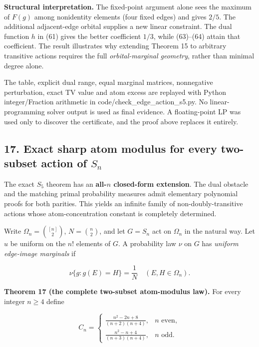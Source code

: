 \documentclass[
  11pt,
]{article}
\begin{document}
\textbf{Structural interpretation.} The fixed-point argument alone sees
the maximum of \(F(g)\) among nonidentity elements (four fixed edges)
and gives \(2/5\). The additional adjacent-edge orbital supplies a new
linear constraint. The dual function \(h\) in (61) gives the better
coefficient \(1/3\), while (63)--(64) attain that coefficient. The
result illustrates why extending Theorem 15 to arbitrary transitive
actions requires the full \emph{orbital-marginal geometry}, rather than
minimal degree alone.

The table, explicit dual range, equal marginal matrices, nonnegative
perturbation, exact TV value and atom excess are replayed with Python
integer/Fraction arithmetic in code/check\_edge\_action\_s5.py. No
linear-programming solver output is used as final evidence. A
floating-point LP was used only to discover the certificate, and the
proof above replaces it entirely.

\subsection{\texorpdfstring{17. Exact sharp atom modulus for every
two-subset action of
\(S_n\)}{17. Exact sharp atom modulus for every two-subset action of S\_n}}\label{exact-sharp-atom-modulus-for-every-two-subset-action-of-s_n}

The exact \(S_5\) theorem has an \textbf{all-\(n\) closed-form
extension}. The dual obstacle and the matching primal probability
measures admit elementary polynomial proofs for both parities. This
yields an infinite family of non-doubly-transitive actions whose
atom-concentration constant is completely determined.

Write \(\Omega_n=\binom{[n]}2\), \(N=\binom n2\), and let \(G=S_n\) act
on \(\Omega_n\) in the natural way. Let \(u\) be uniform on the \(n!\)
elements of \(G\). A probability law \(\nu\) on \(G\) has \emph{uniform
edge-image marginals} if

\[
\nu\{g:g(E)=H\}=\frac1N\quad(E,H\in\Omega_n).
\]

\textbf{Theorem 17 (the complete two-subset atom-modulus law).} For
every integer \(n\ge4\) define

\[
\boxed{
C_n=
\begin{cases}
\displaystyle\frac{n^2-2n+8}{(n+2)(n+4)},&n\text{ even},\\[5pt]
\displaystyle\frac{n^2-n+4}{(n+3)(n+4)},&n\text{ odd}.
\end{cases}} \tag{65}
\]
\end{document}
